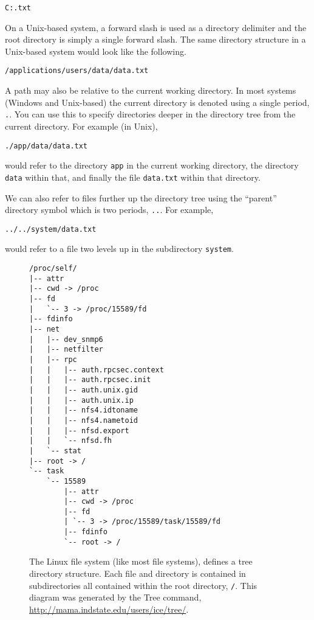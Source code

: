 \texttt{C:\applications\users\data\data.txt}

On a Unix-based system, a forward slash is used as
a directory delimiter and the root directory is simply a
single forward slash.  The same directory structure in
a Unix-based system would look like the following.

\texttt{/applications/users/data/data.txt}

A path may also be  relative to the current working 
directory.  In most systems (Windows and Unix-based)
the current directory is denoted using a single period,
\texttt{.}.  You can use this to specify 
directories deeper in the directory tree from the current
directory.  For example (in Unix), 

\texttt{./app/data/data.txt}

would refer to the directory \texttt{app} in
the current working directory, the directory \texttt{data}
within that, and finally the file \texttt{data.txt}
within that directory.

We can also refer to files further up the directory 
tree using the ``parent'' directory symbol which is 
two periods, \texttt{..}.  For example, 

\texttt{../../system/data.txt}

would refer to a file two levels up in the subdirectory
\texttt{system}.

\begin{figure}
\centering
\begin{verbatim}
/proc/self/
|-- attr
|-- cwd -> /proc
|-- fd
|   `-- 3 -> /proc/15589/fd
|-- fdinfo
|-- net
|   |-- dev_snmp6
|   |-- netfilter
|   |-- rpc
|   |   |-- auth.rpcsec.context
|   |   |-- auth.rpcsec.init
|   |   |-- auth.unix.gid
|   |   |-- auth.unix.ip
|   |   |-- nfs4.idtoname
|   |   |-- nfs4.nametoid
|   |   |-- nfsd.export
|   |   `-- nfsd.fh
|   `-- stat
|-- root -> /
`-- task
    `-- 15589
        |-- attr
        |-- cwd -> /proc
        |-- fd
        | `-- 3 -> /proc/15589/task/15589/fd
        |-- fdinfo
        `-- root -> /
\end{verbatim}
\caption[Linux Tree Directory Structure]{The Linux file system (like most
file systems), defines a tree directory structure.  Each file and directory
is contained in subdirectories all contained within the root directory, 
\texttt{/}.  This diagram was generated by the Tree command, 
\url{http://mama.indstate.edu/users/ice/tree/}.}
\end{figure}

